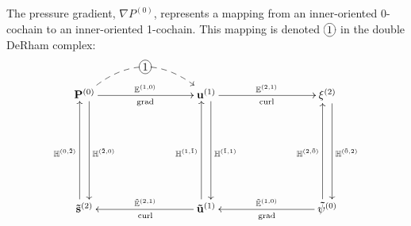 The pressure gradient, $\nabla P^{(0)}$, represents a mapping from an inner-oriented 0-cochain to an inner-oriented 1-cochain. This mapping is denoted $\xymatrix{*+[o][F-]{1}}$  in the double DeRham complex:
\begin{equation}
    \begin{gathered}
        \xymatrix@=20ex{
            \mathbf{P}^{(0)} \ar[r]^{\mathbb{E}^{(1,0)}}_{\text{grad}} \ar@<1ex>[d]^{\mathbb{H}^{(\tilde{2},0)}} \ar @/^6ex/ @{-->} [r]|-*+[o][F-]{1}  & \mathbf{u}^{(1)} \ar[r]^{\mathbb{E}^{(2,1)}}_{\text{curl}} \ar@<1ex>[d]^{\mathbb{H}^{(\tilde{1},1)}} & \mathbf{\xi}^{(2)} \ar@<1ex>[d]^{\mathbb{H}^{(\tilde{0},2)}} \\
            \mathbf{\tilde{s}}^{(2)} \ar@<1ex>[u]^{\mathbb{H}^{(0,\tilde{2})}} & \mathbf{\tilde{u}}^{(1)} \ar[l]_{\tilde{\mathbb{E}}^{(2, 1)}}^{\text{curl}} \ar@<1ex>[u]^{\mathbb{H}^{(1,\tilde{1})}} & \mathbf{\tilde{\psi}}^{(0)} \ar[l]_{\tilde{\mathbb{E}}^{(1,0)}}^{\text{grad}} \ar@<1ex>[u]^{\mathbb{H}^{(2,\tilde{0})}}
        }
    \end{gathered}
    \label{eq:DeRhamPressure}
\end{equation}

